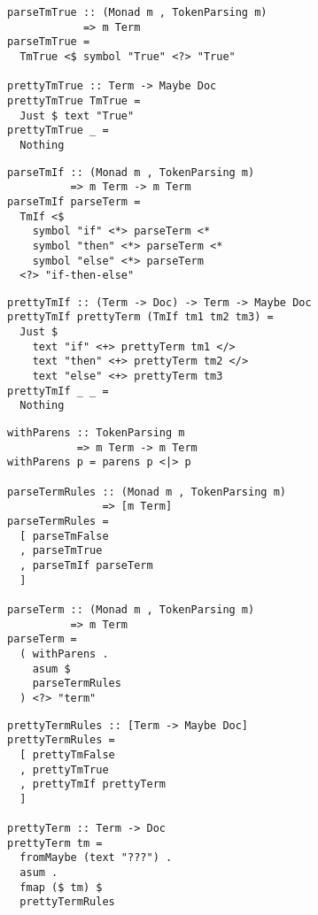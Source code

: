 \documentclass[aspectration=169]{beamer}
\begin{document}
\begin{frame}[fragile]
  \begin{verbatim}
parseTmTrue :: (Monad m , TokenParsing m)
            => m Term
parseTmTrue =
  TmTrue <$ symbol "True" <?> "True"

prettyTmTrue :: Term -> Maybe Doc
prettyTmTrue TmTrue =
  Just $ text "True"
prettyTmTrue _ =
  Nothing
  \end{verbatim}
\end{frame} 

\begin{frame}[fragile]
  \begin{verbatim}
parseTmIf :: (Monad m , TokenParsing m)
          => m Term -> m Term
parseTmIf parseTerm =
  TmIf <$
    symbol "if" <*> parseTerm <*
    symbol "then" <*> parseTerm <*
    symbol "else" <*> parseTerm
  <?> "if-then-else"
  \end{verbatim}
\end{frame} 

\begin{frame}[fragile]
  \begin{verbatim}
prettyTmIf :: (Term -> Doc) -> Term -> Maybe Doc
prettyTmIf prettyTerm (TmIf tm1 tm2 tm3) =
  Just $
    text "if" <+> prettyTerm tm1 </>
    text "then" <+> prettyTerm tm2 </>
    text "else" <+> prettyTerm tm3
prettyTmIf _ _ =
  Nothing
  \end{verbatim}
\end{frame} 

\begin{frame}[fragile]
  \begin{verbatim}
withParens :: TokenParsing m 
           => m Term -> m Term
withParens p = parens p <|> p

parseTermRules :: (Monad m , TokenParsing m)
               => [m Term]
parseTermRules =
  [ parseTmFalse
  , parseTmTrue
  , parseTmIf parseTerm
  ]

parseTerm :: (Monad m , TokenParsing m)
          => m Term
parseTerm =
  ( withParens .
    asum $
    parseTermRules
  ) <?> "term"
  \end{verbatim}
\end{frame} 

\begin{frame}[fragile]
  \begin{verbatim}
prettyTermRules :: [Term -> Maybe Doc]
prettyTermRules =
  [ prettyTmFalse
  , prettyTmTrue
  , prettyTmIf prettyTerm
  ]

prettyTerm :: Term -> Doc
prettyTerm tm =
  fromMaybe (text "???") .
  asum .
  fmap ($ tm) $
  prettyTermRules
  \end{verbatim}
\end{frame} 
\end{document}
